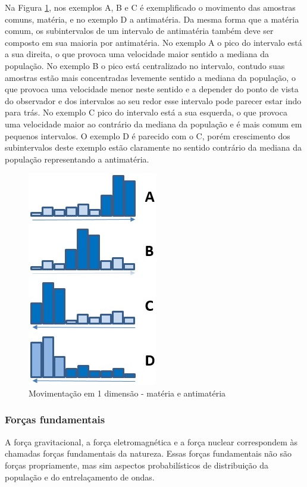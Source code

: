 Na Figura \ref{fig:consciousness_space_matter_antimatter}, nos exemplos A, B e C é exemplificado o movimento das amostras comuns, matéria, e no exemplo D a antimatéria. Da mesma forma que a matéria comum, os subintervalos de um intervalo de antimatéria também deve ser composto em sua maioria por antimatéria. No exemplo A o pico do intervalo está a sua direita, o que provoca uma velocidade maior sentido a mediana da população. No exemplo B o pico está centralizado no intervalo, contudo suas amostras estão mais concentradas levemente sentido a mediana da população, o que provoca uma velocidade menor neste sentido e a depender do ponto de vista do observador e dos intervalos ao seu redor esse intervalo pode parecer estar indo para trás. No exemplo C pico do intervalo está a sua esquerda, o que provoca uma velocidade maior ao contrário da mediana da população e é mais comum em pequenos intervalos. O exemplo D é parecido com o C, porém crescimento dos subintervalos deste exemplo estão claramente no sentido contrário da mediana da população representando a antimatéria. 
	\begin{figure}[H]
	\caption{Movimentação em 1 dimensão - matéria e antimatéria}
	\label{fig:consciousness_space_matter_antimatter}
	\centering
	\includegraphics[scale=.7]{sections/images/consciousness_space_matter_antimatter.jpg}
	\end{figure}

\subsubsection{Forças fundamentais}
A força gravitacional, a força eletromagnética e a força nuclear correspondem às chamadas forças fundamentais da natureza. Essas forças fundamentais não são forças propriamente, mas sim aspectos probabilísticos de distribuição da população e do entrelaçamento de ondas.


